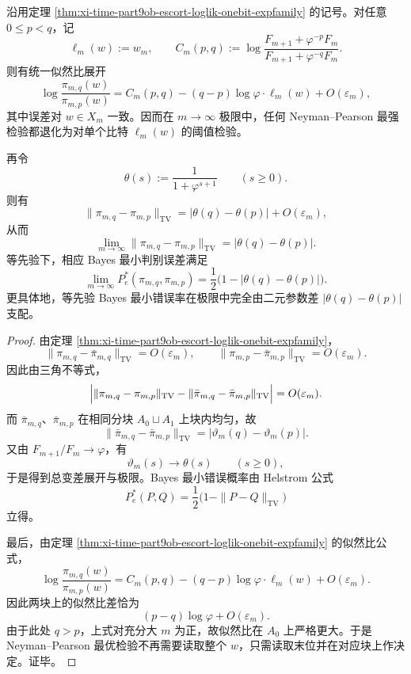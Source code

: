 \begin{theorem}\label{cor:xi-time-part9ob-escort-np-lastbit-collapse}
沿用定理 \ref{thm:xi-time-part9ob-escort-loglik-onebit-expfamily} 的记号。对任意 \(0\le p<q\)，记
\[
\ell_m(w):=w_m,
\qquad
C_m(p,q):=
\log\frac{F_{m+1}+\varphi^{-p}F_m}{F_{m+1}+\varphi^{-q}F_m}.
\]
则有统一似然比展开
\[
\log\frac{\pi_{m,q}(w)}{\pi_{m,p}(w)}
=
C_m(p,q)-(q-p)\log\varphi\cdot \ell_m(w)
+O(\varepsilon_m),
\]
其中误差对 \(w\in X_m\) 一致。因而在 \(m\to\infty\) 极限中，任何 Neyman--Pearson 最强检验都退化为对单个比特 \(\ell_m(w)\) 的阈值检验。

再令
\[
\theta(s):=\frac{1}{1+\varphi^{s+1}}
\qquad (s\ge 0).
\]
则有
\[
\|\pi_{m,q}-\pi_{m,p}\|_{\mathrm{TV}}
=
|\theta(q)-\theta(p)|+O(\varepsilon_m),
\]
从而
\[
\lim_{m\to\infty}\|\pi_{m,q}-\pi_{m,p}\|_{\mathrm{TV}}
=
|\theta(q)-\theta(p)|.
\]
等先验下，相应 Bayes 最小判别误差满足
\[
\lim_{m\to\infty}P_e^\ast(\pi_{m,q},\pi_{m,p})
=
\frac12\bigl(1-|\theta(q)-\theta(p)|\bigr).
\]
更具体地，等先验 Bayes 最小错误率在极限中完全由二元参数差 \(|\theta(q)-\theta(p)|\) 支配。
\end{theorem}
\begin{proof}
由定理 \ref{thm:xi-time-part9ob-escort-loglik-onebit-expfamily}，
\[
\|\pi_{m,q}-\bar\pi_{m,q}\|_{\mathrm{TV}}=O(\varepsilon_m),
\qquad
\|\pi_{m,p}-\bar\pi_{m,p}\|_{\mathrm{TV}}=O(\varepsilon_m).
\]
因此由三角不等式，
\[
\Bigl|
\|\pi_{m,q}-\pi_{m,p}\|_{\mathrm{TV}}
-\|\bar\pi_{m,q}-\bar\pi_{m,p}\|_{\mathrm{TV}}
\Bigr|
=
O(\varepsilon_m).
\]
而 \(\bar\pi_{m,q}\)、\(\bar\pi_{m,p}\) 在相同分块 \(A_0\sqcup A_1\) 上块内均匀，故
\[
\|\bar\pi_{m,q}-\bar\pi_{m,p}\|_{\mathrm{TV}}
=
|\vartheta_m(q)-\vartheta_m(p)|.
\]
又由 \(F_{m+1}/F_m\to\varphi\)，有
\[
\vartheta_m(s)\to\theta(s)
\qquad (s\ge 0),
\]
于是得到总变差展开与极限。Bayes 最小错误概率由 Helstrom 公式
\[
P_e^\ast(P,Q)=\frac12\bigl(1-\|P-Q\|_{\mathrm{TV}}\bigr)
\]
立得。

最后，由定理 \ref{thm:xi-time-part9ob-escort-loglik-onebit-expfamily} 的似然比公式，
\[
\log\frac{\pi_{m,q}(w)}{\pi_{m,p}(w)}
=
C_m(p,q)-(q-p)\log\varphi\cdot \ell_m(w)+O(\varepsilon_m).
\]
因此两块上的似然比差恰为
\[
(p-q)\log\varphi+O(\varepsilon_m).
\]
由于此处 \(q>p\)，上式对充分大 \(m\) 为正，故似然比在 \(A_0\) 上严格更大。于是 Neyman--Pearson 最优检验不再需要读取整个 \(w\)，只需读取末位并在对应块上作决定。证毕。
\end{proof}

